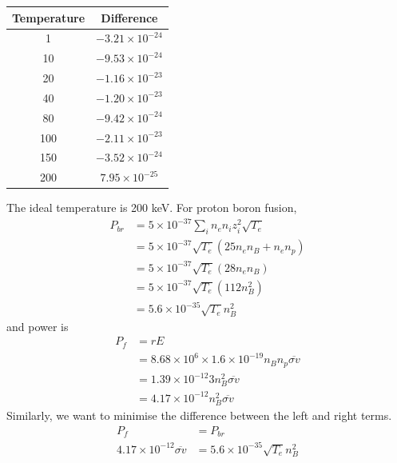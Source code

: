 \documentclass[answers]{exam}
\begin{document}
\begin{questions}
\begin{solution}
    \begin{center}
    \begin{tabular}{|c|c|}
        \hline
        Temperature & Difference \\
        \hline\hline
        1 & $-3.21\times10^{-24}$ \\
        \hline
        10 & $-9.53\times10^{-24}$ \\
        \hline
        20 & $-1.16 \times 10^{-23}$ \\
        \hline
        40 & $-1.20 \times 10^{-23}$ \\
        \hline
        80 & $-9.42 \times 10^{-24}$ \\
        \hline
        100 & $-2.11 \times 10^{-23}$ \\
        \hline
        150 & $-3.52 \times 10^{-24}$ \\
        \hline
        200 & $7.95 \times 10^{-25}$ \\
        \hline
    \end{tabular}
    \end{center}
    \bigskip
    The ideal temperature is 200 keV. For proton boron fusion,
    \begin{align*}
        P_{br} &= 5\times10^{-37} \sum_i n_en_iz_i^2 \sqrt{T_e} \\
               &= 5\times10^{-37} \sqrt{T_e} (25n_en_B + n_en_p) \\
               &= 5\times10^{-37} \sqrt{T_e} (28n_en_B) \\
               &= 5\times10^{-37} \sqrt{T_e} \left(112n_B^2\right) \\
               &= 5.6\times10^{-35} \sqrt{T_e} n_B^2
    \end{align*}
    and power is
    \begin{align*}
        P_f &= rE \\
          &= 8.68 \times 10^6 \times 1.6 \times 10^{-19} n_Bn_p\overline{\sigma v} \\
          &= 1.39 \times 10^{-12} 3n_B^2 \overline{\sigma v} \\
          &= 4.17 \times 10^{-12} n_B^2 \overline{\sigma v}
    \end{align*}
    Similarly, we want to minimise the difference between the left and right terms.
    \begin{align*}
        P_f &= P_{br} \\
        4.17 \times 10^{-12} \overline{\sigma v} &= 5.6 \times 10^{-35} \sqrt{T_e} n_B^2 \\

\end{align*}
\end{solution}
\end{questions}
\end{document}
